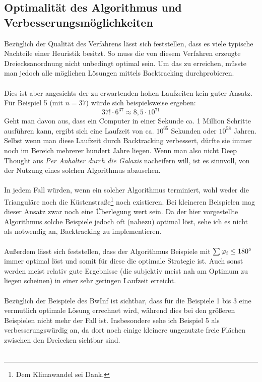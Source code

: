 \documentclass[a4paper, notitlepage, 12pt]{scrartcl}
\begin{document}
  \subsection{Optimalität des Algorithmus und Verbesserungsmöglichkeiten}
  Bezüglich der Qualität des Verfahrens lässt sich feststellen, dass es viele typische Nachteile einer Heuristik besitzt. So muss die von diesem Verfahren erzeugte Dreiecksanordnung nicht unbedingt optimal sein. Um das zu erreichen, müsste man jedoch alle möglichen Lösungen mittels Backtracking durchprobieren. \\ \\
  Dies ist aber angesichts der zu erwartenden hohen Laufzeiten kein guter Ansatz. Für Beispiel 5 (mit $n = 37$) würde sich beispielsweise ergeben:
  \begin{equation}
  37! \cdot 6^{37} \approx 8,5 \cdot 10^{71}
  \end{equation}
  Geht man davon aus, dass ein Computer in einer Sekunde ca. 1 Million Schritte ausführen kann, ergibt sich eine Laufzeit von ca. $10^{65}$ Sekunden oder $10^{58}$ Jahren. Selbst wenn man diese Laufzeit durch Backtracking verbessert, dürfte sie immer noch im Bereich mehrerer hundert Jahre liegen. Wenn man also nicht Deep Thought aus \textit{Per Anhalter durch die Galaxis} nacheifern will, ist es sinnvoll, von der Nutzung eines solchen Algorithmus abzusehen. \\ \\
  In jedem Fall würden, wenn ein solcher Algorithmus terminiert, wohl weder die Trianguläre noch die Küstenstraße\footnote{Dem Klimawandel sei Dank.} noch existieren. Bei kleineren Beispielen mag dieser Ansatz zwar noch eine Überlegung wert sein. Da der hier vorgestellte Algorithmus solche Beispiele jedoch oft (nahezu) optimal löst, sehe ich es nicht als notwendig an, Backtracking zu implementieren. \\ \\
  Außerdem lässt sich feststellen, dass der Algorithmus Beispiele mit $\sum \varphi_i \leq 180\degree$ immer optimal löst und somit für diese die optimale Strategie ist. Auch sonst werden meist relativ gute Ergebnisse (die subjektiv meist nah am Optimum zu liegen scheinen) in einer sehr geringen Laufzeit erreicht. \\ \\
  Bezüglich der Beispiele des BwInf ist sichtbar, dass für die Beispiele 1 bis 3 eine vermutlich optimale Lösung errechnet wird, während dies bei den größeren Beispielen nicht mehr der Fall ist. Insbesondere sehe ich Beispiel 5 als verbesserungswürdig an, da dort noch einige kleinere ungenutzte freie Flächen zwischen den Dreiecken sichtbar sind. \\ \\
\end{document}
